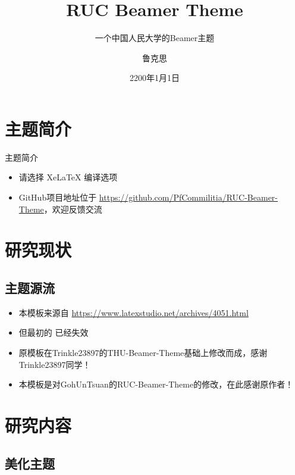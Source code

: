 \documentclass{RucBeamer}
\author{鲁克思}
\title{RUC Beamer Theme}
\subtitle{一个中国人民大学的Beamer主题}
\institute[中国人民大学鲁克思学院]{中国人民大学鲁克思学院\\1145141919}
\date{2200年1月1日}
\begin{document}
\ructitlepage
\ructableofcontents

\section{主题简介}

\begin{frame}{主题简介}
  \begin{itemize}
    \item 请选择 Xe\LaTeX{} 编译选项
    \pause
    \item GitHub项目地址位于 \url{https://github.com/PfCommilitia/RUC-Beamer-Theme}，欢迎反馈交流
  \end{itemize}
\end{frame}

\section{研究现状}

\subsection{主题源流}

\begin{frame}
  \begin{itemize}
    \item 本模板来源自 \url{https://www.latexstudio.net/archives/4051.html}
    \item 但最初的 \href{http://far.tooold.cn/post/latex/beamertsinghua}{\color{purple}{链接}} \cite{origin} 已经失效
    \item 原模板在Trinkle23897的THU-Beamer-Theme基础上修改而成，感谢Trinkle23897同学！\href{https://github.com/Trinkle23897/THU-Beamer-Theme}{\color{red}{仓库链接}}
    \item 本模板是对GohUnTsuan的RUC-Beamer-Theme的修改，在此感谢原作者！\href{https://github.com/GohUnTsuan/RUC-Beamer-Theme}{\color{red}{仓库链接}}
  \end{itemize}
\end{frame}

\section{研究内容}

\subsection{美化主题}
\end{document}
